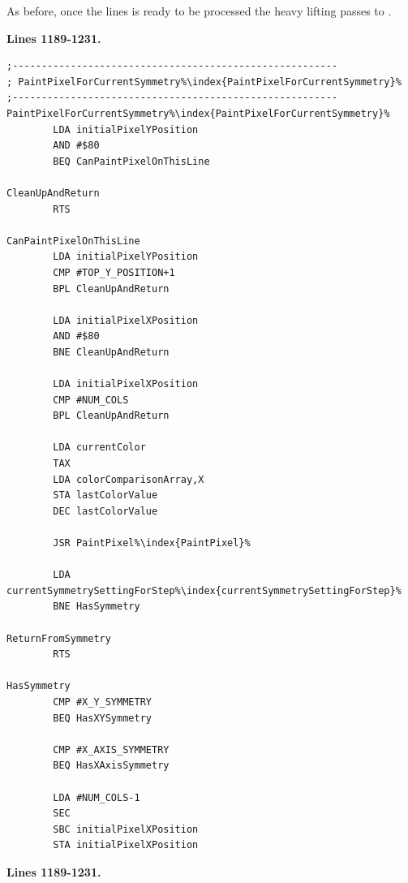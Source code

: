 As before, once the lines is ready to be processed the heavy lifting passes to .

\clearpage
\textbf{Lines 1189-1231. } 
\begin{lstlisting}[escapechar=\%]
;--------------------------------------------------------
; PaintPixelForCurrentSymmetry%\index{PaintPixelForCurrentSymmetry}%
;--------------------------------------------------------
PaintPixelForCurrentSymmetry%\index{PaintPixelForCurrentSymmetry}%   
        LDA initialPixelYPosition
        AND #$80
        BEQ CanPaintPixelOnThisLine

CleanUpAndReturn   
        RTS 

CanPaintPixelOnThisLine   
        LDA initialPixelYPosition
        CMP #TOP_Y_POSITION+1
        BPL CleanUpAndReturn

        LDA initialPixelXPosition
        AND #$80
        BNE CleanUpAndReturn

        LDA initialPixelXPosition
        CMP #NUM_COLS
        BPL CleanUpAndReturn

        LDA currentColor
        TAX 
        LDA colorComparisonArray,X
        STA lastColorValue
        DEC lastColorValue

        JSR PaintPixel%\index{PaintPixel}%

        LDA currentSymmetrySettingForStep%\index{currentSymmetrySettingForStep}%
        BNE HasSymmetry

ReturnFromSymmetry   
        RTS 

HasSymmetry   
        CMP #X_Y_SYMMETRY
        BEQ HasXYSymmetry

        CMP #X_AXIS_SYMMETRY
        BEQ HasXAxisSymmetry

        LDA #NUM_COLS-1
        SEC 
        SBC initialPixelXPosition
        STA initialPixelXPosition

\end{lstlisting}
\clearpage
\textbf{Lines 1189-1231. } 
